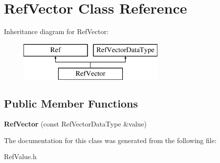 \hypertarget{class_ref_vector}{}\section{Ref\+Vector Class Reference}
\label{class_ref_vector}
Inheritance diagram for Ref\+Vector\+:\begin{figure}[H]
\begin{center}
\leavevmode
\includegraphics[height=2.000000cm]{d4/db2/class_ref_vector}
\end{center}
\end{figure}
\subsection*{Public Member Functions}
\begin{DoxyCompactItemize}
\item 
\mbox{\label{class_ref_vector_a9acee4e9149e8192722bee943c763d24}} 
{\bfseries Ref\+Vector} (const Ref\+Vector\+Data\+Type \&value)
\end{DoxyCompactItemize}


The documentation for this class was generated from the following file\+:\begin{DoxyCompactItemize}
\item 
Ref\+Value.\+h\end{DoxyCompactItemize}
